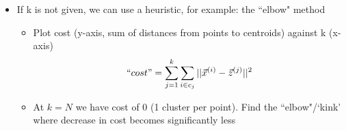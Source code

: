 \documentclass[10pt, oneside]{article}
\begin{document}
\begin{itemize}
\begin{itemize}
        \item If k is not given, we can use a heuristic, for example: the ``elbow" method
        \begin{itemize}
            \item Plot cost (y-axis, sum of distances from points to centroids) against k (x-axis)
            \[``cost" = \sum_{j=1}^k \sum_{i\in c_j} ||\vec x^{(i)} - \vec z^{(j)}||^2\]
            \item At $k=N$ we have cost of 0 (1 cluster per point). Find the ``elbow"/`kink' where decrease in cost becomes significantly less
        \end{itemize}
    \end{itemize}
\end{itemize}



\end{document}
